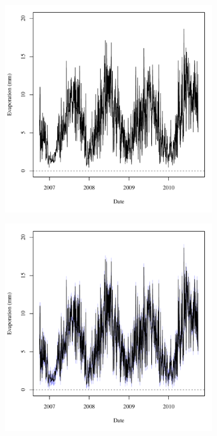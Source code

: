 \begin{linenumbers}
\begin{landscape}
\begin{figure}
\begin{subfigure}{0.7\textwidth}
			\includegraphics[width=\tableCustomSize]{"Figures/Results_DSR/Deterministic/A Evap"}
		\end{subfigure}%
		\begin{subfigure}{0.7\textwidth}
			\centering
			\includegraphics[width=\tableCustomSize]{"Figures/Results_DSR/Stochastic/A Evap"}

\end{subfigure}
\end{figure}
\end{landscape}
\end{linenumbers}
